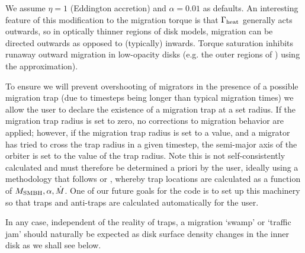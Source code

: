 We assume $\eta=1$ (Eddington accretion) and $\alpha=0.01$ as defaults.
 An interesting feature of this modification to the migration torque is that $\Gamma_{\rm heat}$ generally acts outwards, so in optically thinner regions of disk models, migration can be directed outwards as opposed to (typically) inwards.
 Torque saturation inhibits runaway outward migration in low-opacity disks (e.g. the outer regions of \citealt{ThompsonQuataertMurray05}) using the \citet{HanklaJiangArmitage20} approximation).

To ensure we will prevent overshooting of migrators in the presence of a possible migration trap (due to timesteps being longer than typical migration times) we allow the user to declare the existence of a migration trap at a set radius.
If the migration trap radius is set to zero, no corrections to migration behavior are applied; however, if the migration trap radius is set to a value, and a migrator has tried to cross the trap radius in a given timestep, the semi-major axis of the orbiter is set to the value of the trap radius.
Note this is not self-consistently calculated and must therefore be determined a priori by the user, ideally using a methodology that follows \cite{Bellovary+16} or \cite{Grishin+23}, whereby trap locations are calculated as a function of $M_{\rm SMBH}, \alpha, \dot{M}$.
One of our future goals for the code is to set up this machinery so that traps and anti-traps are calculated automatically for the user.

In any case, independent of the reality of traps, a migration `swamp' or `traffic jam' should naturally be expected as disk surface density changes in the inner disk as we shall see below.%

